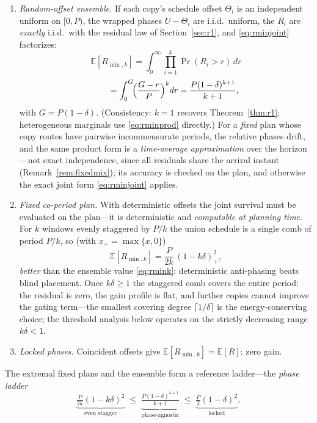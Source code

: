 \documentclass[twocolumn,3p,times,procedia]{elsarticle}
\newcommand{\E}{\mathbb{E}}
\begin{document}
\begin{enumerate}
\item[(i)] \emph{Random-offset ensemble.} If each
copy's schedule offset $\Theta_i$ is an independent uniform on
$[0,P)$, the wrapped phases $U-\Theta_i$
are i.i.d.\ uniform, the $R_i$ are \emph{exactly} i.i.d.\ with the
residual
law of Section~\ref{sec:r1}, and \eqref{eq:rminjoint} factorizes:
\begin{equation}\label{eq:rminprod}
\E[R_{\min,k}]=\int_0^\infty\prod_{i=1}^{k}\Pr(R_i>r)\,dr
\end{equation}
\begin{equation}\label{eq:rmink}
\qquad=\int_0^{G}\!\Bigl(\frac{G-r}{P}\Bigr)^k dr
=\frac{P(1-\delta)^{k+1}}{k+1},
\end{equation}
with $G=P(1-\delta)$. (Consistency: $k{=}1$ recovers
Theorem~\ref{thm:r1}; heterogeneous marginals use
\eqref{eq:rminprod} directly.) For a \emph{fixed} plan whose copy
routes have pairwise incommensurate periods, the relative phases drift,
and the same product form is a \emph{time-average approximation} over
the horizon---not exact independence, since all residuals share the
arrival instant (Remark~\ref{rem:fixedmix}); its accuracy is checked on
the plan, and otherwise the exact joint form \eqref{eq:rminjoint}
applies.
\item[(ii)] \emph{Fixed co-period plan.} With deterministic offsets the
joint survival must be evaluated on the plan---it is deterministic and
\emph{computable at planning time}. For $k$ windows evenly staggered by
$P/k$ the union schedule is a single comb of period $P/k$, so (with
$x_+=\max\{x,0\}$)
\begin{equation}\label{eq:rminstag}
\E[R_{\min,k}]=\frac{P}{2k}\,(1-k\delta)_+^2,
\end{equation}
\emph{better} than the ensemble value \eqref{eq:rmink}: deterministic
anti-phasing beats blind placement. Once $k\delta\ge1$ the staggered
comb covers the entire period: the residual is zero, the gain profile
is flat, and further copies cannot improve the gating term---the
smallest covering degree $\lceil1/\delta\rceil$ is the
energy-conserving choice; the threshold analysis below operates on the
strictly decreasing range $k\delta<1$.
\item[(iii)] \emph{Locked phases.} Coincident offsets give
$\E[R_{\min,k}]=\E[R]$: zero gain.
\end{enumerate}
The extremal fixed plans and the ensemble form a
reference ladder---the \emph{phase ladder}
\begin{equation}\label{eq:ladder}
\underbrace{\tfrac{P}{2k}(1-k\delta)^2}_{\text{even stagger}}
\;\le\;
\underbrace{\tfrac{P(1-\delta)^{k+1}}{k+1}}_{\text{phase-agnostic}}
\;\le\;
\underbrace{\tfrac{P}{2}(1-\delta)^2}_{\text{locked}},
\end{equation}
\end{document}
